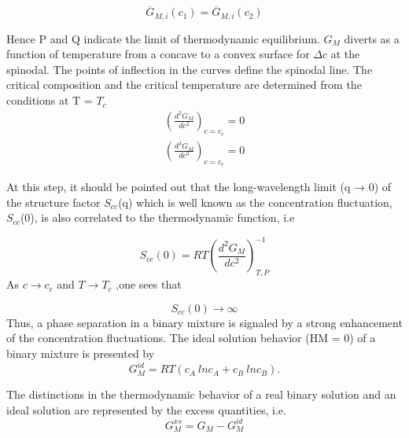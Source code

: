 \documentclass[12pt]{article}
\newcommand*{\1}{\hspace{1pt}}
\begin{document}
        \begin{equation}
            \overline{G} _{M,i}(c _{1}) =  \overline{G} _{M,i}(c _{2})          \tag*{( i= A,B )}
        \end{equation}

        Hence P and Q indicate the limit of thermodynamic equilibrium. $G _M$ diverts as a function of
    temperature from a concave to a convex surface for $\Delta c $ at the spinodal. The points of
    inflection in the curves define the spinodal line. The critical composition and the critical
    temperature are determined from the conditions at T = $T _c$\\

        \begin{align}
            \left(\frac{d^2 {G _M}}{d c^2} \right) _{c = c_c} = 0 \\
            \left(\frac{d^3 {G _M}}{d c^3} \right) _{c = c_c} = 0 
        \end{align}


        At this step, it should be pointed out that the long-wavelength limit (q → 0) of
    the structure factor $S _{cc} $(q) which is well known as the
    concentration fluctuation, $S _{cc} $(0), is also correlated to the thermodynamic function, i.e

        \begin{equation}
            S_{cc}(0) =  RT \left(\frac{d^2 G _M}{d c^2} \right) ^ {-1}_ {T,P}
        \end{equation}
    As $ c\to c _c$ and $ T\to T_c $ ,one sees that

        \begin{equation}
            S_{cc}(0) \to \infty
        \end{equation}  
    Thus, a phase separation in a binary mixture is signaled by a strong enhancement of the
    concentration fluctuations. 
    The ideal solution behavior (HM = 0) of a binary mixture is presented by
        \begin{equation}
            G ^ {id} _M = RT (c_A \ ln c_A + c_B \ ln c_B).
        \end{equation}

    The distinctions in the thermodynamic behavior of a real binary solution and an ideal solution 
    are represented by the excess quantities, i.e.
        \begin{equation}
            G ^ {xs} _M = G _M - G ^{id} _M
        \end{equation}
\end{document}
